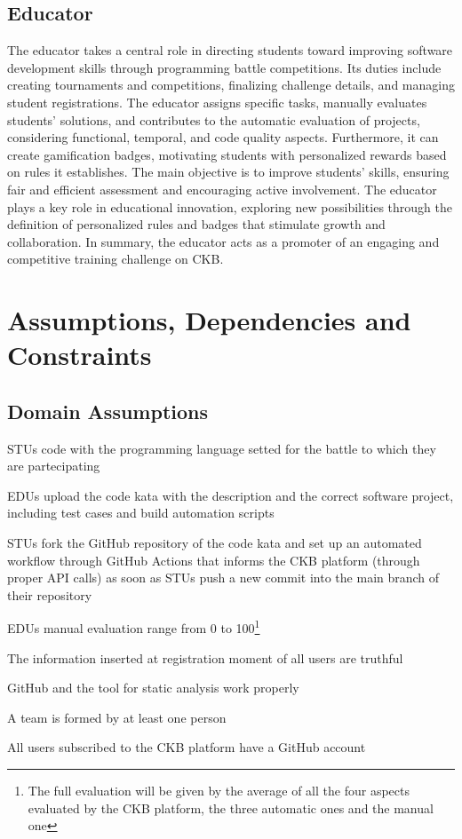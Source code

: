 \subsection*{Educator}
The educator takes a central role in directing students toward improving software development skills through programming battle competitions. 
Its duties include creating tournaments and competitions, finalizing challenge details, and managing student registrations. 
The educator assigns specific tasks, manually evaluates students' solutions, and contributes to the automatic evaluation of projects, considering functional, temporal, and code quality aspects. 
Furthermore, it can create gamification badges, motivating students with personalized rewards based on rules it establishes. 
The main objective is to improve students' skills, ensuring fair and efficient assessment and encouraging active involvement. 
The educator plays a key role in educational innovation, exploring new possibilities through the definition of personalized rules and badges that stimulate growth and collaboration. 
In summary, the educator acts as a promoter of an engaging and competitive training challenge on CKB.

\section{Assumptions, Dependencies and Constraints}

\subsection{Domain Assumptions}
\begin{assumptionsenumerate}
    \item STUs code with the programming language setted for the battle to which they are partecipating
    \item EDUs upload the code kata with the description and the correct software project, including test cases and build automation scripts
    \item STUs fork the GitHub repository of the code kata and set up an automated workflow through GitHub Actions that informs the CKB platform (through proper API calls) as soon as STUs push a new commit into the main branch of their repository
    \item EDUs manual evaluation range from 0 to 100\footnote{The full evaluation will be given by the average of all the four aspects evaluated by the CKB platform, the three automatic ones and the manual one}
    \item The information inserted at registration moment of all users are truthful
    \item GitHub and the tool for static analysis work properly
    \item A team is formed by at least one person
    \item All users subscribed to the CKB platform have a GitHub account
\end{assumptionsenumerate}

